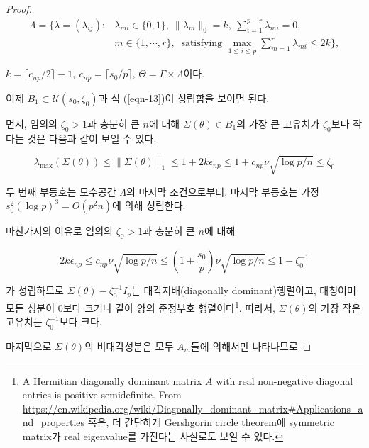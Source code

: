 \begin{proof}
\begin{equation*}
\begin{aligned}
\Lambda= \bigg\{ \lambda = (\lambda_{ij}) : &\lambda_{mi} \in \{0, 1\},~ \lVert \lambda_m \rVert_0 = k,~\sum_{i=1}^{p-r} \lambda_{mi} = 0, \\
&m \in \{ 1, \cdots, r \},~ \text{ satisfying } \max_{1 \leq i \leq p} \sum_{m=1}^r \lambda_{mi} \leq 2k
\bigg\},
\end{aligned}
\end{equation*}

$k = \lceil c_{np} / 2 \rceil - 1,~ c_{np} = \lceil s_0 / p \rceil$, $\Theta = \Gamma \times \Lambda$이다. 

이제 $B_1 \subset \mathcal{U}(s_0, \zeta_0)$과 식 (\ref{eqn-13})이 성립함을 보이면 된다. 

먼저, 임의의 $\zeta_0 >1$과 충분히 큰 $n$에 대해 $\Sigma(\theta) \in B_1$의 가장 큰 고유치가 $\zeta_0$보다 작다는 것은 다음과 같이 보일 수 있다.

\begin{equation*}
    \lambda_{\max}\left(\Sigma(\theta)\right) \leq \lVert \Sigma(\theta) \rVert_1 \leq 1 + 2 k \epsilon_{np} \leq 1 + c_{np} \nu \sqrt{\log p / n} \leq \zeta_0
\end{equation*}

두 번째 부등호는 모수공간 $\Lambda$의 마지막 조건으로부터, 마지막 부등호는 가정 $s_0^2 (\log p)^3 = O(p^2 n)$에 의해 성립한다.

마찬가지의 이유로 임의의 $\zeta_0 >1$과 충분히 큰 $n$에 대해

\begin{equation*}
    2k\epsilon_{np} \leq c_{np} \nu \sqrt{\log p / n}\leq \left( 1 + \frac{s_0}{p} \right) \nu \sqrt{\log p / n} \leq 1 - \zeta_0^{-1}
\end{equation*}

가 성립하므로 $\Sigma(\theta) - \zeta_0^{-1} I_p$는 대각지배(diagonally dominant)행렬이고, 대칭이며 모든 성분이 0보다 크거나 같아 양의 준정부호 행렬이다\footnote{A Hermitian diagonally dominant matrix $A$ with real non-negative diagonal entries is positive semidefinite. From \url{https://en.wikipedia.org/wiki/Diagonally\_dominant\_matrix\#Applications\_and\_properties} 혹은, 더 간단하게 Gershgorin circle theorem에 symmetric matrix가 real eigenvalue를 가진다는 사실로도 보일 수 있다.}. 따라서, $\Sigma(\theta)$의 가장 작은 고유치는 $\zeta_0^{-1}$보다 크다. 

마지막으로 $\Sigma(\theta)$의 비대각성분은 모두 $A_m$들에 의해서만 나타나므로


\end{proof}
